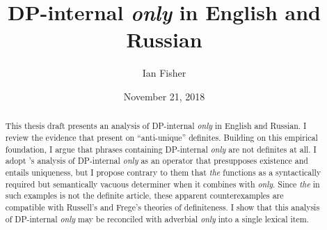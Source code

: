 \documentclass{article}
\title{DP-internal \textit{only} in English and Russian}
\author{Ian Fisher}
\date{November 21, 2018}
\begin{document}
\maketitle

\begin{abstract}
This thesis draft presents an analysis of DP-internal \textit{only} in English and Russian. I review the evidence that \citet{cb2012b, cb2015} present on ``anti-unique'' definites. Building on this empirical foundation, I argue that phrases containing DP-internal \textit{only} are not definites at all. I adopt \citeauthor{cb2015}'s analysis of DP-internal \textit{only} as an operator that presupposes existence and entails uniqueness, but I propose contrary to them that \textit{the} functions as a syntactically required but semantically vacuous determiner when it combines with \textit{only}. Since \textit{the} in such examples is not the definite article, these apparent counterexamples are compatible with Russell's and Frege's theories of definiteness. I show that this analysis of DP-internal \textit{only} may be reconciled with adverbial \textit{only} into a single lexical item.
\end{abstract}












\end{document}
